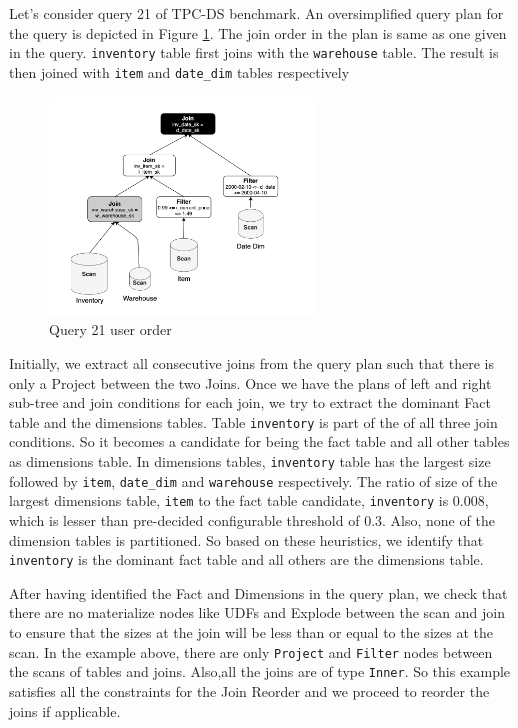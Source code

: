 Let's consider query 21 of TPC-DS benchmark. An oversimplified query plan for the query is depicted in Figure \ref{without-reorder}. The join order in the plan is same as one given in the query. \texttt{inventory} table first joins with the \texttt{warehouse} table. The result is then joined with \texttt{item} and \texttt{date\_dim} tables respectively

\begin{figure}[ht]
\centerline{\includegraphics[width=7cm]{fig/without-reorder.png}}
\caption{Query 21 user order}
\label{without-reorder}
\end{figure}

Initially, we extract all consecutive joins from the query plan such that there is only a Project between the two Joins. Once we have the plans of left and right sub-tree and join conditions for each join, we try to extract the dominant Fact table and the dimensions tables. Table \texttt{inventory} is part of the of all three join conditions. So it becomes a candidate for being the fact table and all other tables as dimensions table. In dimensions tables, \texttt{inventory} table has the largest size followed by \texttt{item}, \texttt{date\_dim} and \texttt{warehouse} respectively. The ratio of size of the largest dimensions table, \texttt{item} to the fact table candidate, \texttt{inventory} is 0.008, which is lesser than pre-decided configurable threshold of 0.3. Also, none of the dimension tables is partitioned. So based on these heuristics, we identify that \texttt{inventory} is the dominant fact table and all others are the dimensions table.

After having identified the Fact and Dimensions in the query plan, we check that there are no materialize nodes like UDFs and Explode between the scan and join to ensure that the sizes at the join will be less than or equal to the sizes at the scan. In the example above, there are only \texttt{Project} and \texttt{Filter} nodes between the scans of tables and joins. Also,all the joins are of type \texttt{Inner}. So this example satisfies all the constraints for the Join Reorder and we proceed to reorder the joins if applicable.

